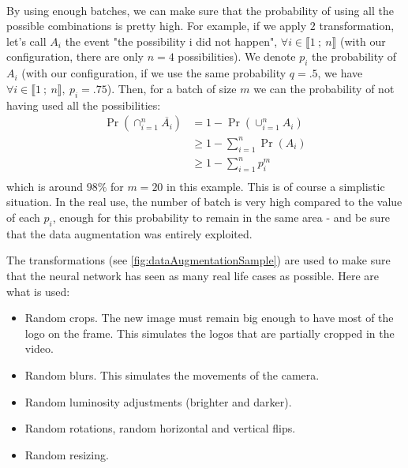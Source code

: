 \documentclass[12pt]{article}%
\begin{document}
\paragraph{}
By using enough batches, we can make sure that the probability of using all the possible combinations is pretty high. For example, if we apply $2$ transformation, let's call $A_i$ the event "the possibility i did not happen", $\forall i \in \llbracket 1~;~ n \rrbracket$ (with our configuration, there are only $n = 4$ possibilities). We denote $p_i$ the probability of $A_i$ (with our configuration, if we use the same probability $q = .5$, we have $\forall i \in \llbracket 1~;~ n \rrbracket, \ p_i = .75$). Then, for a batch of size $m$ we can the probability of not having used all the possibilities:
\begin{align*}
\Pr(\cap_{i=1}^{n} \overline{A_i}) &= 1 - \Pr(\cup_{i=1}^{n} A_{i})\\
&\geq 1 - \sum_{i=1}^{n} \Pr(A_i) \\
&\geq 1 - \sum_{i=1}^{n} p_i^{m} \\
\end{align*}
which is around $98\%$ for $m=20$ in this example. This is of course a simplistic situation. In the real use, the number of batch is very high compared to the value of each $p_i$, enough for this probability to remain in the same area - and be sure that the data augmentation was entirely exploited.

The transformations (see \ref{fig:dataAugmentationSample}) are used to make sure that the neural network has seen as many real life cases as possible. Here are what is used:
\begin{itemize}
    \item Random crops. The new image must remain big enough to have most of the logo on the frame. This simulates the logos that are partially cropped in the video.
    \item Random blurs. This simulates the movements of the camera.
    \item Random luminosity adjustments (brighter and darker).
    \item Random rotations, random horizontal and vertical flips.
    \item Random resizing.
\end{itemize}
\end{document}

